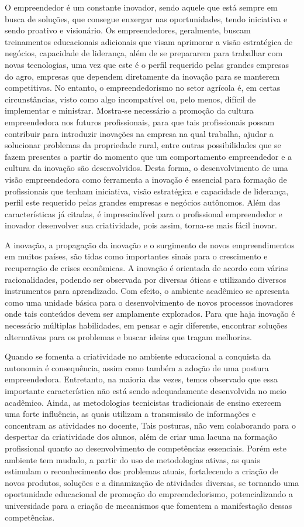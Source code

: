 O empreendedor é um constante inovador, sendo aquele que está sempre em busca de soluções, que consegue enxergar nas oportunidades, tendo iniciativa e sendo proativo e visionário. Os empreendedores, geralmente, buscam treinamentos educacionais adicionais que visam aprimorar a visão estratégica de negócios, capacidade de liderança, além de se prepararem para trabalhar com novas tecnologias, uma vez que este é o perfil requerido pelas grandes empresas do agro, empresas que dependem diretamente da inovação para se manterem competitivas. No entanto, o empreendedorismo no setor agrícola é, em certas circunstâncias, visto como algo incompatível ou, pelo menos, difícil de implementar e ministrar. Mostra-se necessário a promoção da cultura empreendedora nos futuros profissionais, para que tais profissionais possam contribuir para introduzir inovações na empresa na qual trabalha, ajudar a solucionar problemas da propriedade rural, entre outras possibilidades que se fazem presentes a partir do momento que um comportamento empreendedor e a cultura da inovação são desenvolvidos. Desta forma, o desenvolvimento de uma visão empreendedora como ferramenta a inovação é essencial para formação de profissionais que tenham iniciativa, visão estratégica e capacidade de liderança, perfil este requerido pelas grandes empresas e negócios autônomos. Além das características já citadas, é imprescindível para o profissional empreendedor e inovador desenvolver sua criatividade, pois assim, torna-se mais fácil inovar. 

A inovação, a propagação da inovação e o surgimento de novos empreendimentos em muitos países, são tidas como importantes sinais para o crescimento e recuperação de crises econômicas. A inovação é orientada de acordo com várias racionalidades, podendo ser observada por diversas óticas e utilizando diversos instrumentos para aprendizado. Com efeito, o ambiente acadêmico se apresenta como uma unidade básica para o desenvolvimento de novos processos inovadores onde tais conteúdos devem ser amplamente explorados. Para que haja inovação é necessário múltiplas habilidades, em pensar e agir diferente, encontrar soluções alternativas para os problemas e buscar ideias que tragam melhorias. 

Quando se fomenta a criatividade no ambiente educacional a conquista da autonomia é consequência, assim como também a adoção de uma postura empreendedora. Entretanto, na maioria das vezes, temos observado que essa importante característica não está sendo adequadamente desenvolvida no meio acadêmico. Ainda, as metodologias tecnicistas tradicionais de ensino exercem uma forte influência, as quais utilizam a transmissão de informações e concentram as atividades no docente, Tais posturas, não vem colaborando para o despertar da criatividade dos alunos, além de criar uma lacuna na formação profissional quanto ao desenvolvimento de competências essenciais. Porém este ambiente tem mudado, a partir do uso de metodologias ativas, as quais estimulam o reconhecimento dos problemas atuais, fortalecendo a criação de novos produtos, soluções e a dinamização de atividades diversas, se tornando uma oportunidade educacional de promoção do empreendedorismo, potencializando a universidade para a criação de mecanismos que fomentem a manifestação dessas competências.

